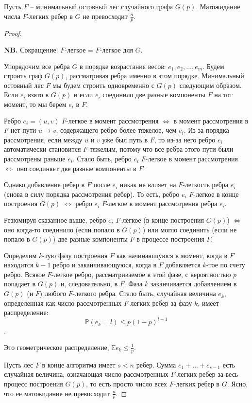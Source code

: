 \begin{theorem*} 
    Пусть $F$ -- минимальный остовный лес случайного графа $G(p)$. Матожидание числа $F$-легких ребер в $G$ не превосходит $\frac{n}{p}$.
\end{theorem*}
\begin{proof}
    $ $
    
    \textbf{NB. } Сокращение: $F$-легкое = $F$-легкое для $G$.
    
    Упорядочим все ребра $G$ в порядке возрастания весов: $e_1, e_2, \ldots, e_m$. Будем строить граф $G(p)$, рассматривая ребра именно в этом порядке. Минимальный остовный лес $F$ мы будем строить одновременно с $G(p)$ следующим образом. Если $e_i$ взято в $G(p)$ и если $e_i$ соединило две разные компоненты $F$ на тот момент, то мы берем $e_i$ в $F$.
    
    Ребро $e_i = (u,v)$ $F$-легкое в момент рассмотрения $\iff$ в момент рассмотрения в $F$ нет пути $u \rightarrow v$, содержащего ребро более тяжелое, чем $e_i$. Из-за порядка рассмотрения, если между $u$ и $v$ уже был путь в $F$, то из-за него ребро $e_i$ автоматически становится $F$-тяжелым, потому что все ребра этого пути были рассмотрены раньше $e_i$. Стало быть, ребро $e_i$ $F$-легкое в момент рассмотрения $\iff$ оно соединяет две разные компоненты в $F$. 
    
    Однако добавление ребер в $F$ после $e_i$ никак не влияет на $F$-легкость ребра $e_i$ (снова в силу порядка рассмотрения ребер). То есть, ребро $e_i$ $F$-легкое в конце построения $G(p)$ $\iff$ ребро $e_i$ $F$-легкое в момент рассмотрения ребра $e_i$.
    
    Резюмируя сказанное выше, ребро $e_i$ $F$-легкое (в конце построения $G(p)$) $\iff$ оно когда-то соединило (если попало в $G(p)$) или могло соединить (если не попало в $G(p)$) две разные компоненты $F$ в процессе построения $F$.
    
    Определим $k$-тую фазу построения $F$ как начинающуюся в момент, когда в $F$ находится $k-1$ ребро и заканчивающуюся, когда в $F$ добавляется $k$-тое по счету ребро. Всякое $F$-легкое ребро, рассматриваемое в этой фазе, с вероятностью $p$ попадает в $G(p)$ и, следовательно, в $F$. Фаза $k$ заканчивается добавлением в $G(p)$ (и $F$) любого $F$-легкого ребра. Стало быть, случайная величина $e_k$, определенная как число рассмотренных $F$-легких ребер за фазу $k$, имеет распределение: $$\mathbb P(e_k = l) \leq  p(1-p)^{l-1}$$.
    
    Это геометрическое распределение, $\mathbb E e_k \leq \frac{1}{p}$.
    
    Пусть лес $F$ в конце алгоритма имеет $s < n$ ребер. Сумма $e_1 + ... + e_{s-1}$ есть случайная величина, означающая число рассмотренных $F$-легких ребер за весь процесс построения $G(p)$, то есть просто число всех $F$-легких ребер в $G$. Ясно, что ее матожидание не превосходит $\frac{n}{p}$.

\end{proof}

